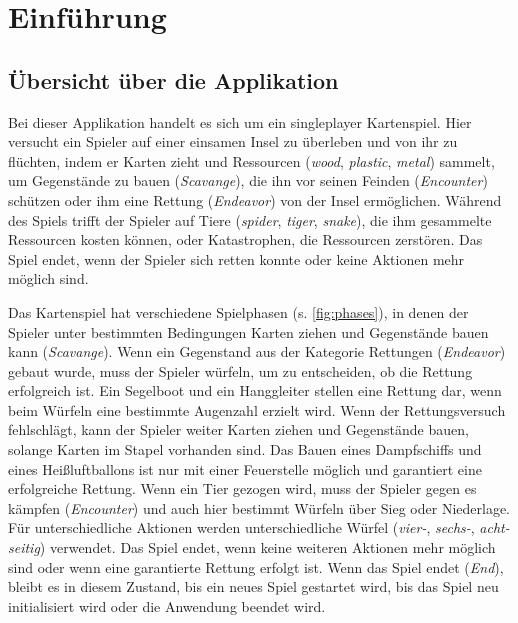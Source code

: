 \chapter{Einführung}

\section{Übersicht über die Applikation}

Bei dieser Applikation handelt es sich um ein singleplayer Kartenspiel. 
Hier versucht ein Spieler auf einer einsamen Insel zu überleben und von ihr zu flüchten, 
indem er Karten zieht und Ressourcen (\textit{wood}, \textit{plastic}, \textit{metal}) sammelt, um Gegenstände zu bauen (\textit{Scavange}), 
die ihn vor seinen Feinden (\textit{Encounter}) schützen oder ihm eine Rettung (\textit{Endeavor}) von der Insel ermöglichen. 
Während des Spiels trifft der Spieler auf Tiere (\textit{spider}, \textit{tiger}, \textit{snake}), 
die ihm gesammelte Ressourcen kosten können, oder Katastrophen, 
die Ressourcen zerstören. Das Spiel endet, wenn der Spieler sich retten konnte oder keine Aktionen mehr möglich sind. 

Das Kartenspiel hat verschiedene Spielphasen (s. \autoref{fig:phases}), in denen der Spieler unter bestimmten Bedingungen Karten ziehen 
und Gegenstände bauen kann (\textit{Scavange}). Wenn ein Gegenstand aus der Kategorie Rettungen (\textit{Endeavor}) gebaut wurde, 
muss der Spieler würfeln, um zu entscheiden, ob die Rettung erfolgreich ist. 
Ein Segelboot und ein Hanggleiter stellen eine Rettung dar, 
wenn beim Würfeln eine bestimmte Augenzahl erzielt wird. 
Wenn der Rettungsversuch fehlschlägt, kann der Spieler weiter Karten ziehen und Gegenstände bauen, 
solange Karten im Stapel vorhanden sind. Das Bauen eines Dampfschiffs und eines Heißluftballons 
ist nur mit einer Feuerstelle möglich und garantiert eine erfolgreiche Rettung. Wenn ein Tier gezogen wird, 
muss der Spieler gegen es kämpfen (\textit{Encounter}) und auch hier bestimmt Würfeln über Sieg oder Niederlage.
Für unterschiedliche Aktionen werden unterschiedliche Würfel (\textit{vier-}, \textit{sechs-}, \textit{acht-seitig}) 
verwendet.
Das Spiel endet, wenn keine weiteren Aktionen mehr möglich sind oder wenn eine garantierte Rettung erfolgt ist. 
Wenn das Spiel endet (\textit{End}), bleibt es in diesem Zustand, bis ein neues Spiel gestartet wird, 
bis das Spiel neu initialisiert wird oder die Anwendung beendet wird. 

